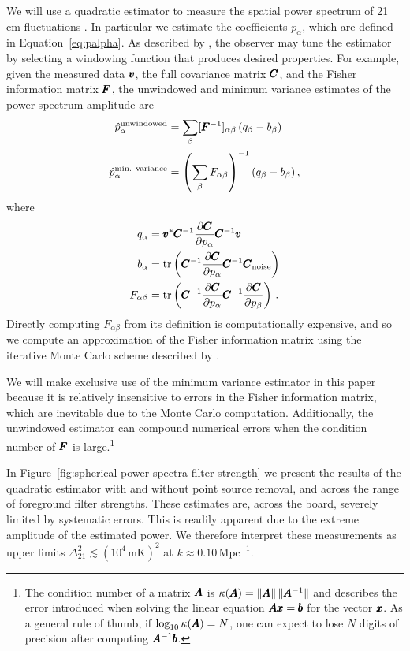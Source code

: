 \begin{bibunit}
We will use a quadratic estimator to measure the spatial power spectrum of 21\,cm fluctuations
\citep{1997PhRvD..55.5895T}. In particular we estimate the coefficients $p_\alpha$, which are
defined in Equation~\ref{eq:palpha}. As described by \citet{2003NewA....8..581P}, the observer may
tune the estimator by selecting a windowing function that produces desired properties. For example,
given the measured data $\pmb v$, the full covariance matrix $\pmb C$, and the Fisher information matrix
$\pmb F$, the unwindowed and minimum variance estimates of the power spectrum amplitude are
\begin{align}
    \hat{p}_\alpha^\text{unwindowed} &= \sum_\beta [\pmb F^{-1}]_{\alpha\beta}\,(q_\beta-b_\beta) \\
    \hat{p}_\alpha^\text{min. variance} &= \left(\sum_\beta
        F_{\alpha\beta}\right)^{-1}(q_\beta-b_\beta)\,,
\end{align}
where
\begin{align}
    q_\alpha &= \pmb v^*\pmb C^{-1}\frac{\partial\pmb C}{\partial p_\alpha}\pmb C^{-1}\pmb v \\
    b_\alpha &= \operatorname{tr}\left(\pmb C^{-1}\frac{\partial\pmb C}{\partial p_\alpha}
                         \pmb C^{-1}\pmb C_\text{noise}\right) \\
    F_{\alpha\beta} &= \operatorname{tr}\left(\pmb C^{-1}\frac{\partial\pmb C}{\partial p_\alpha}
                                \pmb C^{-1}\frac{\partial\pmb C}{\partial p_\beta}\right)\,.
\end{align}
Directly computing $F_{\alpha\beta}$ from its definition is computationally expensive, and so we
compute an approximation of the Fisher information matrix using the iterative Monte Carlo scheme
described by \citet{2013PhRvD..87d3005D}.

We will make exclusive use of the minimum variance estimator in this paper because it is relatively
insensitive to errors in the Fisher information matrix, which are inevitable due to the Monte Carlo
computation. Additionally, the unwindowed estimator can compound numerical errors when the condition
number of $\pmb F$ is large.\footnote{
    The condition number of a matrix $\pmb A$ is $\kappa(\pmb A) = \|\pmb A\|\,\|\pmb A^{-1}\|$ and
    describes the error introduced when solving the linear equation $\pmb A\pmb x=\pmb b$ for the vector
    $\pmb x$. As a general rule of thumb, if $\log_{10}\kappa(\pmb A) = N$, one can expect to lose $N$
    digits of precision after computing $\pmb A^{-1}\pmb b$.
}

In Figure~\ref{fig:spherical-power-spectra-filter-strength} we present the results of the quadratic
estimator with and without point source removal, and across the range of foreground filter
strengths. These estimates are, across the board, severely limited by systematic errors. This is
readily apparent due to the extreme amplitude of the estimated power.  We therefore interpret these
measurements as upper limits $\Delta_{21}^2 \lesssim (10^4\,\text{mK})^2$ at $k\approx
0.10\,\text{Mpc}^{-1}$.


\end{bibunit}
